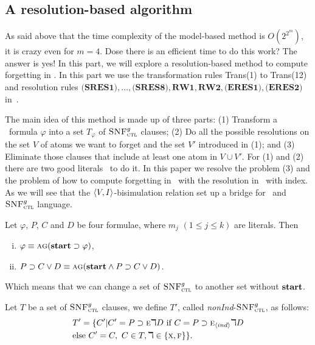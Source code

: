 \documentclass{article}
\begin{document}
\subsection{A resolution-based algorithm}
As said above that the time complexity of the model-based method is $O(2^{2^m})$, it is crazy even for $m=4$. Dose there is an efficient time to do this work? The answer is yes! In this part, we will explore a resolution-based method to compute forgetting in \CTL. In this part we use the transformation rules Trans(1) to Trans(12) and resolution rules $\textbf{(SRES1)}, \dots, \textbf{(SRES8)}, \textbf{RW1}, \textbf{RW2}, \textbf{(ERES1)}, \textbf{(ERES2)}$ in~\cite{zhang2009refined}.

The main idea of this method is made up of three parts: (1) Transform a \CTL\ formula $\varphi$ into a set $T_{\varphi}$ of ${\textsc{SNF}_{\textsc{ctl}}^g}$ clauses; (2) Do all the possible resolutions on the set $V$ of atoms we want to forget and the set $V'$ introduced in (1); and (3) Eliminate those clauses that include at least one atom in $V\cup V'$. For (1) and (2) there are two good literals~\cite{bolotov2000clausal,zhang2009refined} to do it.
In this paper we resolve the problem (3) and the problem of how to compute forgetting in \CTL\ with the resolution in \CTL\ with index.
 As we will see that the ${\langle{V,I}\rangle}$-bisimulation relation set up a bridge for \CTL\ and ${\textsc{SNF}_{\textsc{ctl}}^g}$ language.

 \begin{proposition}\label{pro:Elim:start}
Let $\varphi$, $P$, $C$ and $D$ be four formulae, where $m_j$ $(1\leq j \leq k)$ are literals. Then
\begin{enumerate}[(i)]
    \item $\varphi \equiv \textsc{a} \textsc{g} (\textbf{start} \supset \varphi)$,
    \item $P \supset C \vee D \equiv \textsc{a} \textsc{g} (\textbf{start} \wedge P \supset C \vee D)$.
\end{enumerate}
\end{proposition}
Which means that we can change a set of ${\textsc{SNF}_{\textsc{ctl}}^g}$ to another set without $\textbf{start}$.

Let $T$ be a set of ${\textsc{SNF}_{\textsc{ctl}}^g}$ clauses, we define $T'$, called \emph{nonInd}-${\textsc{SNF}_{\textsc{ctl}}^g}$, as follows:
\begin{align*}
& T' = \{C'| C' =P\supset \textsc{e} \daleth D\ \mbox{if}\ C = P\supset \textsc{e}_{{\langle{ind}\rangle}}\daleth D \\
& \text{else}\ C' = C,\  C\in T, \daleth\in \{\textsc{x}, \textsc{f}\}\}.
\end{align*}
\end{document}
